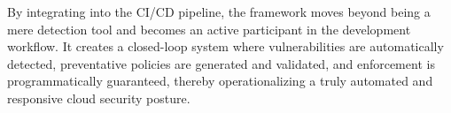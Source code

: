 By integrating into the CI/CD pipeline, the framework moves beyond being a mere detection tool and becomes an active participant in the development workflow. It creates a closed-loop system where vulnerabilities are automatically detected, preventative policies are generated and validated, and enforcement is programmatically guaranteed, thereby operationalizing a truly automated and responsive cloud security posture.

